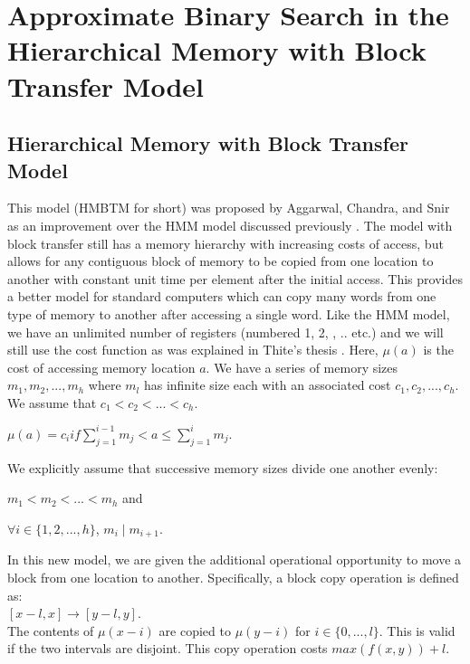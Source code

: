 \documentclass[letterpaper,12pt,titlepage,oneside,final]{book}
\theoremstyle{plain}
\begin{document}
\chapter{Approximate Binary Search in the Hierarchical Memory with Block Transfer Model}\label{Approximate Binary Search in the Hierarchical Memory with Block Transfer Model}

\section{Hierarchical Memory with Block Transfer Model}
This model (HMBTM for short) was proposed by Aggarwal, Chandra, and Snir as an improvement over the HMM model \cite{aggarwal1987model} discussed previously \cite{aggarwal1987hierarchical}. The model with block transfer still has a memory hierarchy with increasing costs of access, but allows for any contiguous block of memory to be copied from one location to another with constant unit time per element after the initial access. This provides a better model for standard computers which can copy many words from one type of memory to another after accessing a single word. Like the HMM model, we have an unlimited number of registers (numbered 1, 2, , .. etc.) and we will still use the cost function as was explained in Thite's thesis \cite{thite2008optimum}. Here, $\mu (a)$ is the cost of accessing memory location $a$. We have a series of memory sizes $m_1, m_2, ..., m_h$ where $m_l$ has infinite size each with an associated cost $c_1, c_2, ..., c_h$. We assume that $c_1 < c_2 < ... < c_h$. 

\begin{center}$\mu (a) = c_i if \sum_{j = 1}^{i-1}m_j  < a \leq \sum_{j = 1}^{i}m_j$. \end{center}

We explicitly assume that successive memory sizes divide one another evenly:
\begin{center}
$m_1 < m_2 < ... < m_h$ and
\end{center}
\begin{center}
$\forall i \in  \{1,2,...,h\}$, $m_i \mid m_{i+1}$.
\end{center}

In this new model, we are given the additional operational opportunity to move a block from one location to another. Specifically, a block copy operation is defined as: \\
 $[x-l, x] \rightarrow [y-l,y]$. \\
The contents of $\mu(x-i)$ are copied to $\mu(y-i)$ for $i \in \{0,...,l\}$. This is valid if the two intervals are disjoint. This copy operation costs $max(f(x,y)) + l$.\\
\end{document}
